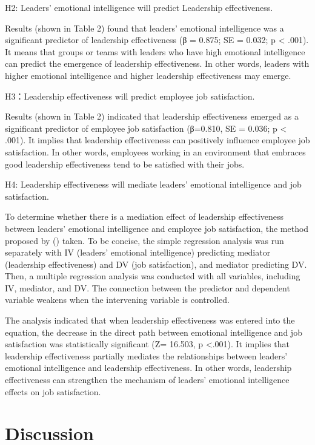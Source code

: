 \documentclass[
  man,
  longtable,
  nolmodern,
  notxfonts,
  notimes,
  colorlinks=true,linkcolor=blue,citecolor=blue,urlcolor=blue]{apa7}
\begin{document}
H2: Leaders' emotional intelligence will predict Leadership
effectiveness.

Results (shown in Table 2) found that leaders' emotional intelligence
was a significant predictor of leadership effectiveness (β = 0.875; SE =
0.032; p \textless{} .001). It means that groups or teams with leaders
who have high emotional intelligence can predict the emergence of
leadership effectiveness. In other words, leaders with higher emotional
intelligence and higher leadership effectiveness may emerge.

H3：Leadership effectiveness will predict employee job satisfaction.

Results (shown in Table 2) indicated that leadership effectiveness
emerged as a significant predictor of employee job satisfaction
(β=0.810, SE = 0.036; p \textless{} .001). It implies that leadership
effectiveness can positively influence employee job satisfaction. In
other words, employees working in an environment that embraces good
leadership effectiveness tend to be satisfied with their jobs.

H4: Leadership effectiveness will mediate leaders' emotional
intelligence and job satisfaction.

To determine whether there is a mediation effect of leadership
effectiveness between leaders' emotional intelligence and employee job
satisfaction, the method proposed by
() taken. To be
concise, the simple regression analysis was run separately with IV
(leaders' emotional intelligence) predicting mediator (leadership
effectiveness) and DV (job satisfaction), and mediator predicting DV.
Then, a multiple regression analysis was conducted with all variables,
including IV, mediator, and DV. The connection between the predictor and
dependent variable weakens when the intervening variable is controlled.

The analysis indicated that when leadership effectiveness was entered
into the equation, the decrease in the direct path between emotional
intelligence and job satisfaction was statistically significant (Z=
16.503, p \textless.001). It implies that leadership effectiveness
partially mediates the relationships between leaders' emotional
intelligence and leadership effectiveness. In other words, leadership
effectiveness can strengthen the mechanism of leaders' emotional
intelligence effects on job satisfaction.

\section{Discussion}\label{discussion}
\end{document}
